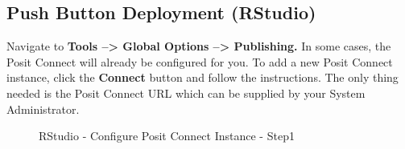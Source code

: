 \documentclass[
  letterpaper,
  DIV=11,
  numbers=noendperiod]{scrreprt}
\begin{document}
\subsection{Push Button Deployment
(RStudio)}\label{push-button-deployment-rstudio}

Navigate to \textbf{Tools --\textgreater{} Global Options
--\textgreater{} Publishing.} In some cases, the Posit Connect will
already be configured for you. To add a new Posit Connect instance,
click the \textbf{Connect} button and follow the instructions. The only
thing needed is the Posit Connect URL which can be supplied by your
System Administrator.

\begin{figure}


\caption{\label{fig-rstudio-connect1}RStudio - Configure Posit Connect
Instance - Step1}

\end{figure}%
\end{document}

